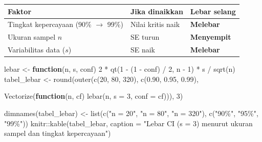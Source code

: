 \documentclass[
  indonesian,
  letterpaper,
]{book}
\newenvironment{Shaded}{\begin{snugshade}}{\end{snugshade}}
\newcommand{\AttributeTok}[1]{\textcolor[rgb]{0.40,0.45,0.13}{#1}}
\newcommand{\ControlFlowTok}[1]{\textcolor[rgb]{0.00,0.23,0.31}{\textbf{#1}}}
\newcommand{\DecValTok}[1]{\textcolor[rgb]{0.68,0.00,0.00}{#1}}
\newcommand{\FloatTok}[1]{\textcolor[rgb]{0.68,0.00,0.00}{#1}}
\newcommand{\FunctionTok}[1]{\textcolor[rgb]{0.28,0.35,0.67}{#1}}
\newcommand{\NormalTok}[1]{\textcolor[rgb]{0.00,0.23,0.31}{#1}}
\newcommand{\OtherTok}[1]{\textcolor[rgb]{0.00,0.23,0.31}{#1}}
\newcommand{\SpecialCharTok}[1]{\textcolor[rgb]{0.37,0.37,0.37}{#1}}
\newcommand{\StringTok}[1]{\textcolor[rgb]{0.13,0.47,0.30}{#1}}
\newcounter{none} %
\begin{document}
{\def\LTcaptype{none} %
\begin{longtable}[]{@{}
  >{\raggedright\arraybackslash}p{}
  >{\raggedright\arraybackslash}p{}
  >{\raggedright\arraybackslash}p{}@{}}
\toprule\noalign{}
\begin{minipage}[b]{\linewidth}\raggedright
Faktor
\end{minipage} & \begin{minipage}[b]{\linewidth}\raggedright
Jika dinaikkan
\end{minipage} & \begin{minipage}[b]{\linewidth}\raggedright
Lebar selang
\end{minipage} \\
\midrule\noalign{}
\endhead
\bottomrule\noalign{}
\endlastfoot
Tingkat kepercayaan (90\% \(\rightarrow\) 99\%) & Nilai kritis naik &
\textbf{Melebar} \\
Ukuran sampel \(n\) & SE turun & \textbf{Menyempit} \\
Variabilitas data (\(s\)) & SE naik & \textbf{Melebar} \\
\end{longtable}
}

\begin{Shaded}
\begin{Highlighting}[]
\NormalTok{lebar }\OtherTok{\textless{}{-}} \ControlFlowTok{function}\NormalTok{(n, s, conf) }\DecValTok{2} \SpecialCharTok{*} \FunctionTok{qt}\NormalTok{(}\DecValTok{1} \SpecialCharTok{{-}}\NormalTok{ (}\DecValTok{1} \SpecialCharTok{{-}}\NormalTok{ conf) }\SpecialCharTok{/} \DecValTok{2}\NormalTok{, n }\SpecialCharTok{{-}} \DecValTok{1}\NormalTok{) }\SpecialCharTok{*}\NormalTok{ s }\SpecialCharTok{/} \FunctionTok{sqrt}\NormalTok{(n)}
\NormalTok{tabel\_lebar }\OtherTok{\textless{}{-}} \FunctionTok{round}\NormalTok{(}\FunctionTok{outer}\NormalTok{(}\FunctionTok{c}\NormalTok{(}\DecValTok{20}\NormalTok{, }\DecValTok{80}\NormalTok{, }\DecValTok{320}\NormalTok{), }\FunctionTok{c}\NormalTok{(}\FloatTok{0.90}\NormalTok{, }\FloatTok{0.95}\NormalTok{, }\FloatTok{0.99}\NormalTok{),}

\FunctionTok{Vectorize}\NormalTok{(}\ControlFlowTok{function}\NormalTok{(n, cf) }\FunctionTok{lebar}\NormalTok{(n, }\AttributeTok{s =} \DecValTok{3}\NormalTok{, }\AttributeTok{conf =}\NormalTok{ cf))), }\DecValTok{3}\NormalTok{)}

\FunctionTok{dimnames}\NormalTok{(tabel\_lebar) }\OtherTok{\textless{}{-}} \FunctionTok{list}\NormalTok{(}\FunctionTok{c}\NormalTok{(}\StringTok{"n = 20"}\NormalTok{, }\StringTok{"n = 80"}\NormalTok{, }\StringTok{"n = 320"}\NormalTok{), }\FunctionTok{c}\NormalTok{(}\StringTok{"90\%"}\NormalTok{, }\StringTok{"95\%"}\NormalTok{, }\StringTok{"99\%"}\NormalTok{))}
\NormalTok{knitr}\SpecialCharTok{::}\FunctionTok{kable}\NormalTok{(tabel\_lebar, }\AttributeTok{caption =} \StringTok{"Lebar CI (s = 3) menurut ukuran sampel dan tingkat kepercayaan"}\NormalTok{)}
\end{Highlighting}
\end{Shaded}
\end{document}
